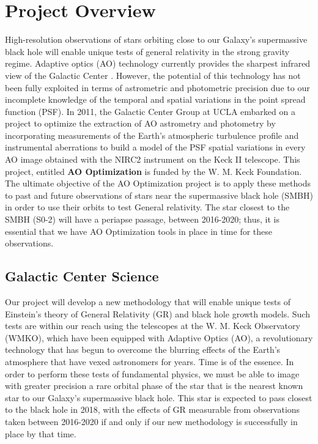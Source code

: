 \section{Project Overview}

High-resolution observations of stars orbiting close to our Galaxy's supermassive black hole will enable unique tests of general relativity in the strong gravity regime. Adaptive optics (AO) technology currently provides the sharpest infrared view of the Galactic Center \cite{Ghez_2005}. However, the potential of this technology has not been fully exploited in terms of astrometric and photometric precision due to our incomplete knowledge of the temporal and spatial variations in the point spread function (PSF). In 2011, the Galactic Center Group at UCLA embarked on a project to optimize the extraction of AO astrometry and photometry by incorporating measurements of the Earth's atmospheric turbulence profile and instrumental aberrations to build a model of the PSF spatial variations in every AO image obtained with the NIRC2 instrument on the Keck II telescope. This project, entitled \textbf{AO Optimization} is funded by the W. M. Keck Foundation. The ultimate objective of the AO Optimization project is to apply these methods to past and future observations of stars near the supermassive black hole (SMBH) in order to use their orbits to test General relativity. The star closest to the SMBH (S0-2) will have a periapse passage, between 2016-2020; thus, it is essential that we have AO Optimization tools in place in time for these observations. 

\subsection{Galactic Center Science}

Our project will develop a new methodology that will enable unique tests of Einstein's theory of General Relativity (GR) and black hole growth models. Such tests are within our reach using the telescopes at the W. M. Keck Observatory (WMKO), which have been equipped with Adaptive Optics (AO), a revolutionary technology that has begun to overcome the blurring effects of the Earth's atmosphere that have vexed astronomers for years. Time is of the essence. In order to perform these tests of fundamental physics, we must be able to image with greater precision a rare orbital phase of the star that is the nearest known star to our Galaxy’s supermassive black hole. This star is expected to pass closest to the black hole in 2018, with the effects of GR measurable from observations taken between 2016-2020 if and only if our new methodology is successfully in place by that time.

